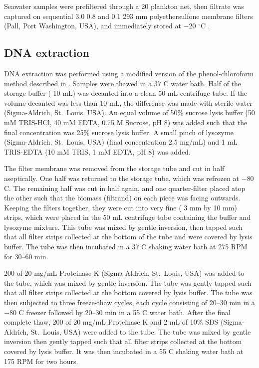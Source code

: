 Seawater samples were prefiltered through a 20 \micron{} plankton net, then filtrate was captured on sequential 3.0 \micron{} 0.8 \micron{} and 0.1 \micron{} 293 mm polyethersulfone membrane filters (Pall, Port Washington, USA), and immediately stored at $-20$ $^\circ$C \cite{Rusch:2007ez,Ng:2010cd}.

\subsection{DNA extraction}

DNA extraction was performed using a modified version of the phenol-chloroform method described in \citet{Rusch:2007ez}.
Samples were thawed in a 37 \textdegree{}C water bath.
Half of the storage buffer (\textapprox{} 10 mL) was decanted into a clean 50 mL centrifuge tube.
If the volume decanted was less than 10 mL, the difference was made with sterile water (Sigma-Aldrich, St.\ Louis, USA).
An equal volume of 50\% sucrose lysis buffer (50 mM TRIS-HCl, 40 mM EDTA, 0.75 M Sucrose, pH 8) was added such that the final concentration was 25\% sucrose lysis buffer.
A small pinch of lysozyme (Sigma-Aldrich, St.\ Louis, USA) (final concentration \textapprox{} 2.5 mg/mL) and 1 mL TRIS-EDTA (10 mM TRIS, 1 mM EDTA, pH 8) was added.

The filter membrane was removed from the storage tube and cut in half aseptically.
One half was returned to the storage tube, which was refrozen at $-80$ \textdegree{}C.
The remaining half was cut in half again, and one quarter-filter placed atop the other such that the biomass (filtrand) on each piece was facing outwards.
Keeping the filters together, they were cut into very fine (\textapprox{} 3 mm by 10 mm) strips, which were placed in the 50 mL centrifuge tube containing the buffer and lysozyme mixture.
This tube was mixed by gentle inversion, then tapped such that all filter strips collected at the bottom of the tube and were covered by lysis buffer.
The tube was then incubated in a 37 \textdegree{}C shaking water bath at 275 RPM for 30--60 min.

200 \microlitre{} of 20 mg/mL Proteinase K (Sigma-Aldrich, St.\ Louis, USA) was added to the tube, which was mixed by gentle inversion.
The tube was gently tapped such that all filter strips collected at the bottom covered by lysis buffer.
The tube was then subjected to three freeze-thaw cycles, each cycle consisting of 20--30 min in a $-80$ \textdegree{}C freezer followed by 20--30 min in a 55 \textdegree{}C water bath.
After the final complete thaw, 200 \microlitre{} of 20 mg/mL Proteinase K and 2 mL of 10\% SDS (Sigma-Aldrich, St.\ Louis, USA) were added to the tube.
The tube was mixed by gentle inversion then gently tapped such that all filter strips collected at the bottom covered by lysis buffer.
It was then incubated in a 55 \textdegree{}C shaking water bath at 175 RPM for two hours.


